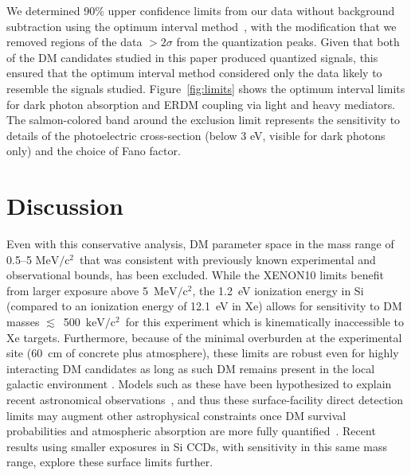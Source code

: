 \documentclass[%
reprint,
superscriptaddress,
preprintnumbers,
amsmath,amssymb,
prl,
aps,
floatfix
]{revtex4-1}
\newcommand{\keV}{$\mathrm{keV/c^2}$}
\newcommand{\MeV}{$\mathrm{MeV/c^2}$}
\begin{document}
We determined 90\% upper confidence limits from our data without background subtraction using the optimum interval method~\cite{Yellin,OI2007}, with the modification that we removed regions of the data $>2\sigma$ from the quantization peaks. Given that both of the DM candidates studied in this paper produced quantized signals, this ensured that the optimum interval method considered only the data likely to resemble the signals studied. Figure~\ref{fig:limits} shows the optimum interval limits for dark photon absorption and ERDM coupling via light and heavy mediators. The salmon-colored band around the exclusion limit represents the sensitivity to details of the photoelectric cross-section (below 3 eV, visible for dark photons only) and the choice of Fano factor.

\section{Discussion}

Even with this conservative analysis, DM parameter space in the mass range of 0.5--5 \MeV\, that was consistent with previously known experimental and observational bounds, has been excluded. While the XENON10 limits benefit from larger exposure above 5~\MeV, the 1.2~eV ionization energy in Si (compared to an ionization energy of 12.1~eV in Xe) allows for sensitivity to DM masses $\lesssim$~500~\keV\ for this experiment which is kinematically inaccessible to Xe targets. Furthermore, because of the minimal overburden at the experimental site (60~cm of concrete plus atmosphere), these limits are robust even for highly interacting DM candidates as long as such DM remains present in the local galactic environment \cite{Munoz_2018pzp, McDermott_PRD11_millichargedDM}. Models such as these have been hypothesized to explain recent astronomical observations~\cite{barkana}, and thus these surface-facility direct detection limits may augment other astrophysical constraints once DM survival probabilities and atmospheric absorption are more fully quantified~\cite{Berlin:2018sjs,Fraser:2018acy}. Recent results using smaller exposures in Si CCDs, with sensitivity in this same mass range, explore these surface limits further\cite{SENSEI}.
\end{document}
